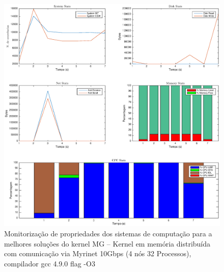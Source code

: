 \documentclass[conference,compsoc]{IEEEtran}
\begin{document}
\begin{figure}
\centering
\includegraphics[width=\textwidth]{EPS/DSTAT/MG_MPI_MX_GCC.eps}
\caption{Monitorização de propriedades dos sistemas de computação para a melhores soluções do kernel MG -- Kernel em memória distribuída com comunicação via Myrinet 10Gbps (4 nós 32 Processos), compilador gcc 4.9.0 flag -O3}
\label{dstat_mg}
\end{figure}


\end{document}
